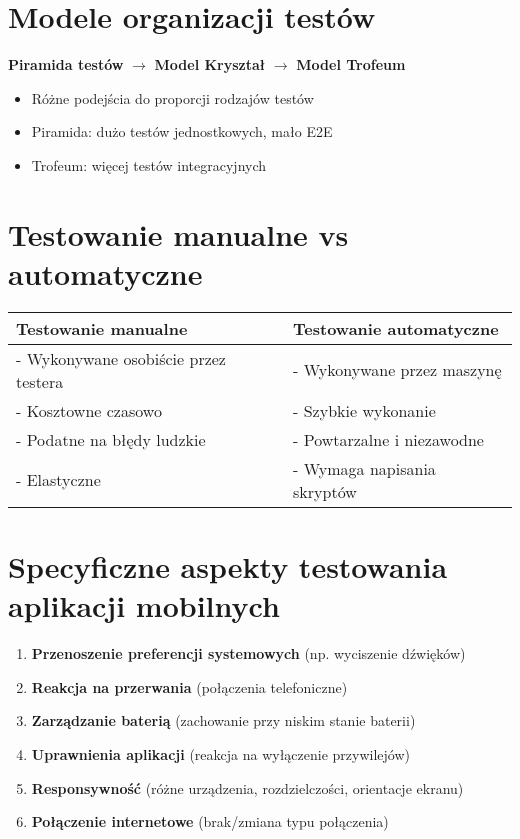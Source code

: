 \section{Modele organizacji testów}

\begin{tcolorbox}[colback=green!5!white,colframe=green!75!black]
\textbf{Piramida testów} $\rightarrow$ \textbf{Model Kryształ} $\rightarrow$ \textbf{Model Trofeum}
\begin{itemize}
    \item Różne podejścia do proporcji rodzajów testów
    \item Piramida: dużo testów jednostkowych, mało E2E
    \item Trofeum: więcej testów integracyjnych
\end{itemize}
\end{tcolorbox}

\section{Testowanie manualne vs automatyczne}

\begin{tabular}{|p{}|p{}|}
\hline
\textbf{Testowanie manualne} & \textbf{Testowanie automatyczne} \\
\hline
- Wykonywane osobiście przez testera & - Wykonywane przez maszynę \\
- Kosztowne czasowo & - Szybkie wykonanie \\
- Podatne na błędy ludzkie & - Powtarzalne i niezawodne \\
- Elastyczne & - Wymaga napisania skryptów \\
\hline
\end{tabular}

\section{Specyficzne aspekty testowania aplikacji mobilnych}

\begin{enumerate}[leftmargin=*]
    \item \textbf{Przenoszenie preferencji systemowych} (np. wyciszenie dźwięków)
    \item \textbf{Reakcja na przerwania} (połączenia telefoniczne)
    \item \textbf{Zarządzanie baterią} (zachowanie przy niskim stanie baterii)
    \item \textbf{Uprawnienia aplikacji} (reakcja na wyłączenie przywilejów)
    \item \textbf{Responsywność} (różne urządzenia, rozdzielczości, orientacje ekranu)
    \item \textbf{Połączenie internetowe} (brak/zmiana typu połączenia)
\end{enumerate}

